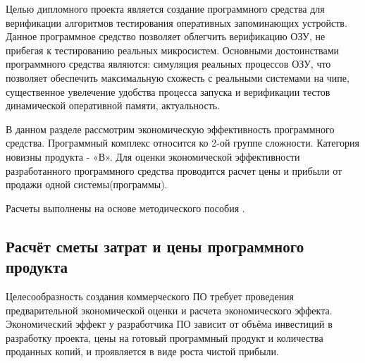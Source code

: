 








Целью дипломного проекта является создание программного средства для верификации алгоритмов тестирования оперативных запоминающих устройств.
Данное программное средство позволяет облегчить верификацию ОЗУ, не прибегая к тестированию реальных микросистем. Основными достоинствами программного средства являются: симуляция реальных процессов ОЗУ, что позволяет обеспечить максимальную схожесть с реальными системами на чипе, существенное увелечение удобства процесса запуска и верификации тестов динамической оперативной памяти, актуальность.

В данном разделе рассмотрим экономическую эффективность программного средства. Программный комплекс относится ко 2-ой группе сложности. Категория новизны продукта - «В».
Для оценки экономической эффективности разработанного программного средства проводится расчет цены и прибыли от продажи одной системы(программы).

Расчеты выполнены на основе методического пособия \cite{palicyn_2006}.

\subsection{Расчёт сметы затрат и цены программного продукта}

Целесообразность создания коммерческого ПО требует проведения предварительной экономической оценки и расчета экономического эффекта.
Экономический эффект у разработчика ПО зависит от объёма инвестиций в разработку проекта, цены на готовый программный продукт и количества проданных копий, и проявляется в виде роста чистой прибыли.


